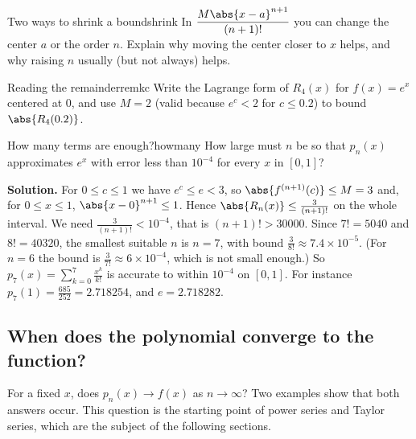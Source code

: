 \documentclass[11pt]{article}
\begin{document}
\begin{think}{Two ways to shrink a bound}{shrink}
In $\dfrac{M\abs{x-a}^{n+1}}{(n+1)!}$ you can change the center $a$ or the order $n$. Explain why moving the center closer to $x$ helps, and why raising $n$ usually (but not always) helps.
\end{think}

\begin{kc}{Reading the remainder}{remkc}
Write the Lagrange form of $R_4(x)$ for $f(x)=e^x$ centered at $0$, and use $M=2$ (valid because $e^c<2$ for $c\le0.2$) to bound $\abs{R_4(0.2)}$.
\end{kc}

\begin{exmp}{How many terms are enough?}{howmany}
How large must $n$ be so that $p_n(x)$ approximates $e^x$ with error less than $10^{-4}$ for every $x$ in $[0,1]$?

\textbf{Solution.} For $0\le c\le1$ we have $e^c\le e<3$, so $\abs{f^{(n+1)}(c)}\le M=3$ and, for $0\le x\le1$, $\abs{x-0}^{n+1}\le1$. Hence $\abs{R_n(x)}\le\frac3{(n+1)!}$ on the whole interval. We need $\frac3{(n+1)!}<10^{-4}$, that is $(n+1)!>30000$. Since $7!=5040$ and $8!=40320$, the smallest suitable $n$ is $n=7$, with bound $\frac3{8!}\approx7.4\times10^{-5}$. (For $n=6$ the bound is $\frac3{7!}\approx6\times10^{-4}$, which is not small enough.) So $p_7(x)=\sum_{k=0}^7\frac{x^k}{k!}$ is accurate to within $10^{-4}$ on $[0,1]$. For instance $p_7(1)=\frac{685}{252}=2.718254$, and $e=2.718282$.
\end{exmp}

\subsection*{When does the polynomial converge to the function?}

For a fixed $x$, does $p_n(x)\to f(x)$ as $n\to\infty$? Two examples show that both answers occur. This question is the starting point of power series and Taylor series, which are the subject of the following sections.
\end{document}
